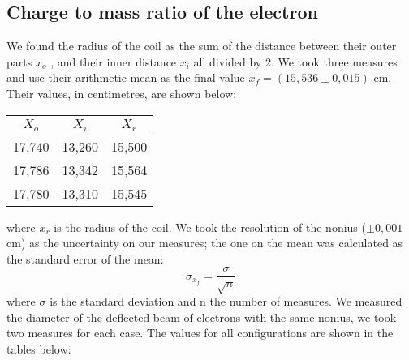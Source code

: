 \subsection{Charge to mass ratio of the electron}
We found the radius of the coil as the sum of the distance between their outer parts $x_o$ , and their inner distance $x_i$ all divided by 2. We took three measures  and use their arithmetic mean as the final value $x_f=(15,536\pm 0,015)$ cm. Their values, in centimetres, are shown below:

\begin{table}[h!]
    \centering
        \begin{tabular}{|c|c|c|}
            \hline
            \textbf{$X_o$} & \textbf{$X_i$} & \textbf{$X_r$} \\
            \hline
            17,740 & 13,260 & 15,500 \\
            \hline
            17,786 & 13,342 & 15,564 \\
            \hline
            17,780 & 13,310 & 15,545 \\
            \hline
        \end{tabular} 
\end{table}
where $x_r$ is the radius of the coil.  
We took the resolution of the nonius ($\pm 0,001$ cm) as the uncertainty on our measures; the one on the mean was calculated as the standard error of the mean:
\begin{equation*}
    \sigma_{x_f}=\frac{\sigma}{\sqrt{n}}
\end{equation*}
where $\sigma$ is the standard deviation and n the number of measures.
We measured the diameter of the deflected beam of electrons with the same nonius, we took two measures for each case. The values for all configurations are shown in the tables below:
